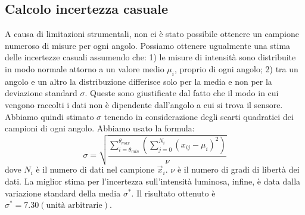 \subsection{Calcolo incertezza casuale}\label{subsec:calcolo-incertezza-casuale}
  A causa di limitazioni strumentali, non ci è stato possibile ottenere un campione
  numeroso di misure per ogni angolo. Possiamo ottenere ugualmente
  una stima delle incertezze casuali assumendo che: %
  1) le misure di intensità sono distribuite in modo normale attorno a un valore
    medio $\mu_i$, proprio di ogni angolo;
  2) tra un angolo e un altro la distribuzione differisce solo per la media e non per la
    deviazione standard $\sigma$.
  Queste sono giustificate dal fatto che il modo in cui vengono raccolti i dati
  non è dipendente dall'angolo a cui si trova il sensore.
  Abbiamo quindi stimato $\sigma$ tenendo in considerazione degli scarti quadratici
  dei campioni di ogni angolo.
  Abbiamo usato la formula:
  \begin{equation}
    \sigma = \sqrt{
      \frac {
        \sum_{i = \theta_{min}}^{\theta_{max}} \left(
          \sum_{j = 0}^{N_i} (x_{ij} -\mu_i)^2
        \right)
      } {
        \nu
      }
    }
  \end{equation}
  \noindent dove $N_i$ è il numero di dati nel campione $\vec{x}_i$.
  $\nu$ è il numero di gradi di libertà dei dati. La miglior stima per l'incertezza
  sull'intensità luminosa, infine, è data dalla variazione standard della media $\sigma^*$.
  Il risultato ottenuto è $\sigma^* = 7.30 (\text{unità arbitrarie})$.
\endinput

